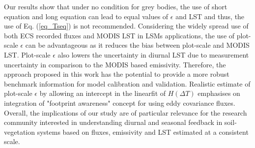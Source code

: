 \documentclass[fleqn,10pt]{wlscirep}
\begin{document}
Our results show that under no condition for grey bodies, the use of short equation and long equation can lead to equal values of $\epsilon$ and LST and thus, the use of Eq. (\ref{eq_Tseq}) is not recommended. Considering the widely spread use of both ECS recorded fluxes and MODIS LST in LSMs applications, the use of plot-scale $\epsilon$ can be advantageous as it reduces the bias between plot-scale and MODIS LST. Plot-scale $\epsilon$ also lowers the uncertainty in diurnal LST due to measurement uncertainty in comparison to the MODIS based emissivity. Therefore, the approach proposed in this work has the potential to provide a more robust benchmark information for model calibration and validation. Realistic estimate of plot-scale $\epsilon$ by allowing an intercept in the linearfit of $H (\Delta T)$ emphasises on integration of "footprint awareness" concept for using eddy covariance fluxes. Overall, the implications of our study are of particular relevance for the research community interested in understanding diurnal and seasonal feedback in soil-vegetation systems based on fluxes, emissivity and LST estimated at a consistent scale.


\end{document}
